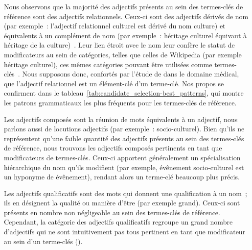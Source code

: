       Nous observons que la majorité des adjectifs présents au sein des
      termes-clés de référence sont des adjectifs relationnels. Ceux-ci sont des
      adjectifs dérivés de nom (par exemple~: l'adjectif relationnel
      \og{}culturel\fg{} est dérivé du nom \og{}culture\fg{}) et équivalents à
      un complément de nom (par exemple~: \og{}héritage culturel\fg{} équivaut à
      \og{}héritage de la
      culture\fg{})~\cite{bally1944linguistiquegeneraleetlinguistiquefrancaise}.
      Leur lien étroit avec le nom leur confère le statut de modificateurs au
      sein de catégories, telles que celles de Wikipedia (par exemple
      \og{}héritage culturel\fg{}), ces mêmes catégories pouvant être utilisées
      comme termes-clés~\cite{medelyan2008smalltrainingset,eichler2010keywe}.
      Nous supposons donc, confortés par l'étude de
       dans le domaine médical, que
      l'adjectif relationnel est un élément-clé d'un terme-clé. Nos propos se
      confirment dans le tableau~\ref{tab:candidate_selection-best_patterns},
      qui montre les patrons grammaticaux les plus fréquents pour les
      termes-clés de référence.
      
      Les adjectifs composés sont la réunion de mots équivalents à un adjectif,
      nous parlons aussi de locutions adjectifs (par exemple~:
      \og{}socio-culturel\fg{}). Bien qu'ils ne représentent qu'une faible
      quantité des adjectifs présents au sein des termes-clés de référence, nous
      trouvons les adjectifs composés pertinents en tant que modificateurs de
      termes-clés. Ceux-ci apportent généralement un spécialisation hiérarchique
      du nom qu'ils modifient (par exemple, \og{}évênement socio-culturel\fg{}
      est un hyponyme de \og{}évênement\fg{}), rendant alors un terme-clé
      beaucoup plus précis.
      
      Les adjectifs qualificatifs sont des mots qui donnent une qualification à
      un nom~; ils en désignent la qualité ou manière d'être (par exemple
      \og{}grand\fg{}). Ceux-ci sont présents en nombre non négligeable au sein
      des termes-clés de référence. Cependant, la catégorie des adjectifs
      qualificatifs regroupe un grand nombre d'adjectifs qui ne sont
      intuitivement pas tous pertinent en tant que modificateur au sein d'un
      terme-clés (). 

